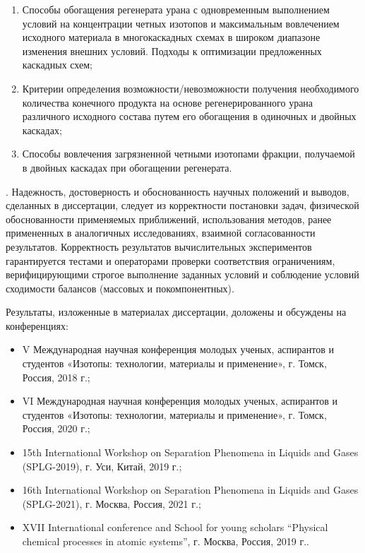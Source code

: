 {}
\begin{enumerate}
  \item Способы обогащения регенерата урана с одновременным выполнением условий на концентрации четных изотопов и максимальным вовлечением исходного материала в многокаскадных схемах в широком диапазоне изменения внешних условий. Подходы к оптимизации предложенных каскадных схем;
  \item Критерии определения возможности/невозможности получения необходимого количества конечного продукта на основе регенерированного урана различного исходного состава путем его обогащения в одиночных и двойных каскадах;
  \item Способы вовлечения загрязненной четными изотопами фракции, получаемой в двойных каскадах при обогащении регенерата. 
\end{enumerate}

{\reliability}.
Надежность, достоверность и обоснованность научных положений и выводов, сделанных в диссертации, следует из корректности постановки задач, физической обоснованности применяемых приближений, использования методов, ранее примененных в аналогичных исследованиях, взаимной согласованности результатов. Корректность результатов вычислительных экспериментов гарантируется тестами и операторами проверки соответствия ограничениям, верифицирующими строгое выполнение заданных условий и соблюдение условий сходимости балансов (массовых и покомпонентных).

{\probation}
Результаты, изложенные в материалах диссертации, доложены и обсуждены на конференциях:
\begin{itemize}
  \item V Международная научная конференция молодых ученых, аспирантов и студентов «Изотопы: технологии, материалы и применение», г. Томск, Россия, 2018 г.;
  \item VI Международная научная конференция молодых ученых, аспирантов и студентов «Изотопы: технологии, материалы и применение», г. Томск, Россия, 2020 г.;
  \item 15th International Workshop on Separation Phenomena in Liquids and Gases (SPLG-2019), г. Уси, Китай, 2019 г.;
  \item 16th International Workshop on Separation Phenomena in Liquids and Gases (SPLG-2021), г. Москва, Россия, 2021 г.;
  \item XVII International conference and School for young scholars “Physical chemical processes in atomic systems”, г. Москва, Россия, 2019 г..
\end{itemize}

